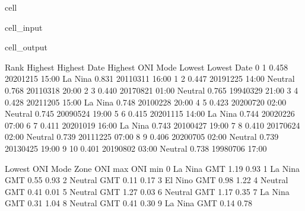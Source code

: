 \documentclass[letterpaper,10pt,english]{jupyterBook}
\begin{document}
\begin{sphinxuseclass}{cell}
\begin{sphinxVerbatimInput}
\begin{sphinxuseclass}{cell_input}
\begin{sphinxVerbatim}[commandchars=\\\{\}]
                             \PYG{p}{[}\PYG{p}{]}
                             \PYG{p}{[}\PYG{p}{]}

\end{sphinxVerbatim}

\end{sphinxuseclass}\end{sphinxVerbatimInput}
\begin{sphinxVerbatimOutput}

\begin{sphinxuseclass}{cell_output}
\begin{sphinxVerbatim}[commandchars=\\\{\}]
   Rank  Highest      Highest Date Highest ONI Mode  Lowest       Lowest Date  \PYGZbs{}
0     1    0.458  2020\PYGZhy{}12\PYGZhy{}15 15:00          La Nina  \PYGZhy{}0.831  2011\PYGZhy{}03\PYGZhy{}11 16:00   
1     2    0.447  2019\PYGZhy{}12\PYGZhy{}25 14:00          Neutral  \PYGZhy{}0.768  2011\PYGZhy{}03\PYGZhy{}18 20:00   
2     3    0.440  2017\PYGZhy{}08\PYGZhy{}21 01:00          Neutral  \PYGZhy{}0.765  1994\PYGZhy{}03\PYGZhy{}29 21:00   
3     4    0.428  2021\PYGZhy{}12\PYGZhy{}05 15:00          La Nina  \PYGZhy{}0.748  2010\PYGZhy{}02\PYGZhy{}28 20:00   
4     5    0.423  2020\PYGZhy{}07\PYGZhy{}20 02:00          Neutral  \PYGZhy{}0.745  2009\PYGZhy{}05\PYGZhy{}24 19:00   
5     6    0.415  2020\PYGZhy{}11\PYGZhy{}15 14:00          La Nina  \PYGZhy{}0.744  2002\PYGZhy{}02\PYGZhy{}26 07:00   
6     7    0.411  2020\PYGZhy{}10\PYGZhy{}19 16:00          La Nina  \PYGZhy{}0.743  2010\PYGZhy{}04\PYGZhy{}27 19:00   
7     8    0.410  2017\PYGZhy{}06\PYGZhy{}24 02:00          Neutral  \PYGZhy{}0.739  2011\PYGZhy{}12\PYGZhy{}25 07:00   
8     9    0.406  2020\PYGZhy{}07\PYGZhy{}05 02:00          Neutral  \PYGZhy{}0.739  2013\PYGZhy{}04\PYGZhy{}25 19:00   
9    10    0.401  2019\PYGZhy{}08\PYGZhy{}02 03:00          Neutral  \PYGZhy{}0.738  1998\PYGZhy{}07\PYGZhy{}06 17:00   

  Lowest ONI Mode Zone  ONI max  ONI min  
0         La Nina  GMT    \PYGZhy{}1.19    \PYGZhy{}0.93  
1         La Nina  GMT     0.55    \PYGZhy{}0.93  
2         Neutral  GMT    \PYGZhy{}0.11     0.17  
3         El Nino  GMT    \PYGZhy{}0.98     1.22  
4         Neutral  GMT    \PYGZhy{}0.41     0.01  
5         Neutral  GMT    \PYGZhy{}1.27     0.03  
6         Neutral  GMT    \PYGZhy{}1.17     0.35  
7         La Nina  GMT     0.31    \PYGZhy{}1.04  
8         Neutral  GMT    \PYGZhy{}0.41    \PYGZhy{}0.30  
9         La Nina  GMT     0.14    \PYGZhy{}0.78  
\end{sphinxVerbatim}


\end{sphinxuseclass}
\end{sphinxVerbatimOutput}
\end{sphinxuseclass}
\end{document}
